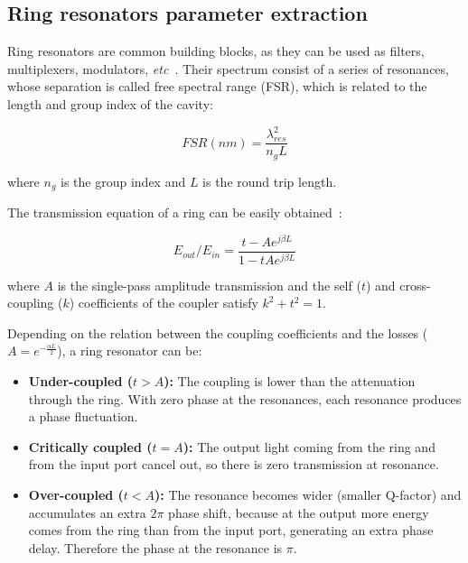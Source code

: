 \documentclass[journal]{IEEEtran}
\begin{document}
\subsection{Ring resonators parameter extraction}
\label{sec:ringResonators}
Ring resonators are common building blocks, as they can be used as filters, multiplexers, modulators, \emph{etc}~\cite{Bogaerts:12}.
Their spectrum consist of a series of resonances, whose separation is called free spectral range (FSR), which is related to the length and group index of the cavity:

\begin{equation}
	FSR (nm)=\frac{\lambda_{res}^2}{n_gL}
	\label{eq:FSRanillo}
\end{equation} 

where $n_g$ is the group index and $L$ is the round trip length.

The transmission equation of a ring can be easily obtained~\cite{McKinnon2009}:

\begin{equation}
	E_{out}/E_{in}=\frac{t-Ae^{j\beta L}}{1-tAe^{j\beta L}}
\label{eq:transmissionRing}
\end{equation}


where $A$ is the single-pass amplitude transmission and the self ($t$) and cross-coupling ($k$) coefficients of the coupler satisfy $k^2+t^2=1$.

Depending on the relation between the coupling coefficients and the losses ($A=e^{-\frac{\alpha L}{2}}$), a ring resonator can be:

\begin{itemize}
 \item \textbf{Under-coupled ($t>A$):} The coupling is lower than the attenuation through the ring.
 With zero phase at the resonances, each resonance produces a phase fluctuation. 

 \item \textbf{Critically coupled ($t=A$):} The output light coming from the ring and from the input port cancel out, so there is zero transmission at resonance.

 
 \item \textbf{Over-coupled ($t<A$):} The resonance becomes wider (smaller Q-factor) and accumulates an extra $2\pi$ phase shift, because at the output more energy comes from the ring than from the input port, generating an extra phase delay.
 Therefore the phase at the resonance is $\pi$.
\end{itemize}
\end{document}
